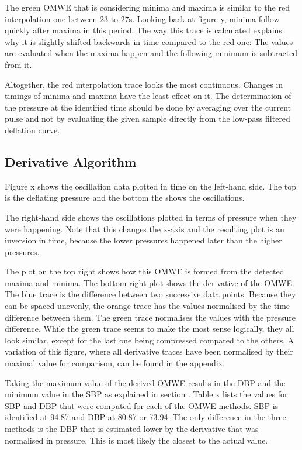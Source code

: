 The green OMWE that is considering minima and maxima is similar to the red interpolation one between 23 to 27s. Looking back at figure y, minima follow quickly after maxima in this period. The way this trace is calculated explains why it is slightly shifted backwards in time compared to the red one: The values are evaluated when the maxima happen and the following minimum is subtracted from it. 

Altogether, the red interpolation trace looks the most continuous. Changes in timings of minima and maxima have the least effect on it. The determination of the pressure at the identified time should be done by averaging over the current pulse and not by evaluating the given sample directly from the low-pass filtered deflation curve.

\subsection{Derivative Algorithm}

Figure x shows the oscillation data plotted in time on the left-hand side. The top is the deflating pressure and the bottom the shows the oscillations. 

The right-hand side shows the oscillations plotted in terms of pressure when they were happening. Note that this changes the x-axis and the resulting plot is an inversion in time, because the lower pressures happened later than the higher pressures. 

The plot on the top right shows how this OMWE is formed from the detected maxima and minima. The bottom-right plot shows the derivative of the OMWE. The blue trace is the difference between two successive data points. Because they can be spaced unevenly, the orange trace has the values normalised by the time difference between them. The green trace normalises the values with the pressure difference. While the green trace seems to make the most sense logically, they all look similar, except for the last one being compressed compared to the others. A variation of this figure, where all derivative traces have been normalised by their maximal value for comparison, can be found in the appendix.

Taking the maximum value of the derived OMWE results in the DBP and the minimum value in the SBP as explained in section .
Table x lists the values for SBP and DBP that were computed for each of the OMWE methods. SBP is identified at 94.87 and DBP at 80.87 or 73.94. The only difference in the three methods is the DBP that is estimated lower by the derivative that was normalised in pressure. This is most likely the closest to the actual value.

